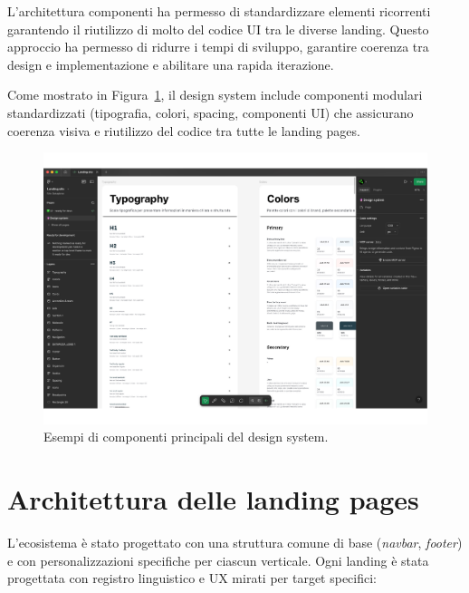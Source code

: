 L'architettura componenti ha permesso di standardizzare elementi ricorrenti 
garantendo il riutilizzo di molto del codice UI tra le diverse landing. Questo 
approccio ha permesso di ridurre i tempi di sviluppo, garantire coerenza tra 
design e implementazione e abilitare una rapida iterazione.

Come mostrato in Figura~\ref{fig:design-system}, il design system include 
componenti modulari standardizzati (tipografia, colori, spacing, componenti UI) 
che assicurano coerenza visiva e riutilizzo del codice tra tutte le landing pages.

\begin{figure}[h!]
    \centering
    \includegraphics[width=\textwidth]{chapters/figures/design-system.pdf}
    \caption{Esempi di componenti principali del design system.}
    \label{fig:design-system}
\end{figure}

\clearpage
\section{Architettura delle landing pages}
L'ecosistema è stato progettato con una struttura comune di base (\textit{navbar}, 
\textit{footer}) e con personalizzazioni specifiche per ciascun verticale. 
Ogni landing è stata progettata con registro linguistico e UX mirati per target 
specifici:

